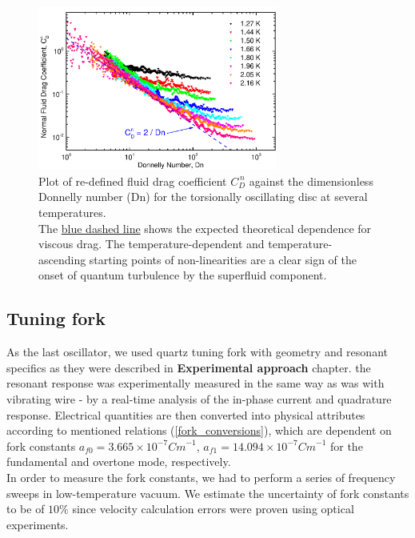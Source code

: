 \newpage

\begin{figure}[h]
	\centering
  \includegraphics[width=0.7\textwidth]{graphics/results/disc_drag_donnelly}
  \caption{Plot of re-defined fluid drag coefficient $C_D^{\,n}$ against the dimensionless Donnelly number (Dn) for the torsionally oscillating disc at several temperatures.\\
  The \underline{blue dashed line} shows the expected theoretical dependence \cite{universal_scaling} for viscous drag. The temperature-dependent and temperature-ascending starting points of non-linearities are a clear sign of the onset of quantum turbulence by the superfluid component.}
  \label{disc_drag_donnelly}
\end{figure}



\subsection{Tuning fork}

As the last oscillator, we used quartz tuning fork with geometry and resonant specifics as they were described in \textbf{Experimental approach} chapter. the resonant response was experimentally measured in the same way as was with vibrating wire - by a real-time analysis of the in-phase current and quadrature response. Electrical quantities are then converted into physical attributes according to mentioned relations (\ref{fork_conversions}), which are dependent on fork constants $a_{f0} = 3.665 \times 10^{-7} \unit{Cm}^{-1}$, $a_{f1} = 14.094 \times 10^{-7} \unit{Cm}^{-1}$ for the fundamental and overtone mode, respectively. \\
In order to measure the fork constants, we had to perform a series of frequency sweeps in low-temperature vacuum. We estimate the uncertainty of fork constants to be of $10\%$ since velocity calculation errors were proven using optical experiments. \cite{optical_exps}


